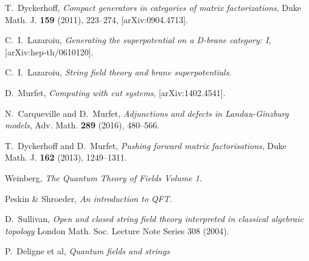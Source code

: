 \documentclass[english,letter paper,12pt,leqno]{article}
\theoremstyle{example}
\numberwithin{equation}{section}
\begin{document}
\newpage


\providecommand{\bysame}{\leavevmode\hbox to3em{\hrulefill}\thinspace}
\providecommand{\href}[2]{#2}
\begin{thebibliography}{BHLS03}
  
T.~Dyckerhoff, \textsl{Compact generators in categories of matrix factorizations},
  Duke Math. J. \textbf{159} (2011), 223--274,
  \href{http://arxiv.org/abs/0904.4713}{[arXiv:0904.4713]}.
  
C.~I.~Lazaroiu, \textsl{Generating the superpotential on a D-brane category: I}, [arXiv:hep-th/0610120].

C.~I.~Lazaroiu, \textsl{String field theory and brane superpotentials}.
  
D.~Murfet, \textsl{Computing with cut systems}, \href{http://arxiv.org/abs/1402.4541}{[arXiv:1402.4541]}.

N.~Carqueville and D.~Murfet, \textsl{Adjunctions and defects in Landau-Ginzburg models}, Adv. Math. \textbf{289} (2016), 480--566.

T.~Dyckerhoff and D.~Murfet, \textsl{Pushing forward matrix factorisations}, Duke Math. J. \textbf{162} (2013), 1249--1311.

Weinberg, \textsl{The Quantum Theory of Fields Volume 1}.

Peskin \& Shroeder, \textsl{An introduction to QFT}.

D.~Sullivan, \textsl{Open and closed string field theory interpreted in classical algebraic topology} London Math. Soc. Lecture Note Series 308 (2004).

P.~Deligne et al, \textsl{Quantum fields and strings}

\end{thebibliography}
\end{document}
